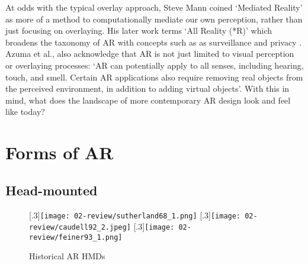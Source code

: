 At odds with the typical overlay approach, Steve Mann coined `Mediated Reality' \citeyearpar{mann1994} as more of a method to computationally mediate our own perception, rather than just focusing on overlaying. His later work terms `All Reality (*R)' which broadens the taxonomy of AR with concepts such as as surveillance and privacy \citeyearpar{mann2018}. Azuma et al., also acknowledge that AR is not just limited to visual perception or overlaying processes: `AR can potentially apply to all senses, including hearing, touch, and smell. Certain AR applications also require removing real objects from the perceived environment, in addition to adding virtual objects'. With this in mind, what does the landscape of more contemporary AR design look and feel like today?




\section{Forms of AR}\label{sec: ar-forms}
\subsection{Head-mounted}\label{sec: ar-forms-hmd}
\begin{figure}
    \centering
    [.3\linewidth]{\texttt{[image: 02-review/sutherland68\_1.png]}}
    \hfill
    [.3\linewidth]{\texttt{[image: 02-review/caudell92\_2.jpeg]}}
    \hfill
    [.3\linewidth]{\texttt{[image: 02-review/feiner93\_1.png]}}%
    \caption{Historical AR HMDs}
    \label{fig: historicalHMDs}
\end{figure}

